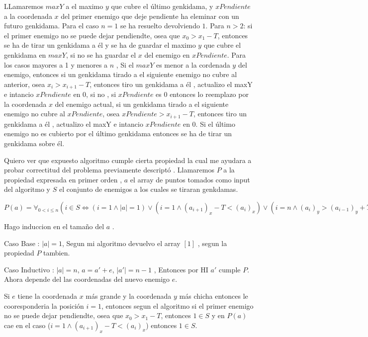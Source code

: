         LLamaremos $maxY$ a el maximo $y$ que cubre el último genkidama, y $xPendiente$ a la coordenada $x$ del primer enemigo que deje pendiente ha eleminar con un futuro genkidama.
        Para el caso $n = 1$ se ha resuelto devolviendo $1$. Para $n > 2$: si el primer enemigo no se puede dejar pendiendte, osea que $x_0 > x_1  - T$, entonces se ha de tirar un genkidama a él y se ha de guardar el maximo $y$ que cubre el genkidama en $maxY$, si no se ha guardar el $x$ del enemigo en $xPendiente$. Para los casos mayores a 1 y menores a $n$ , Si el $maxY$ es menor a la cordenada $y$ del enemigo, entonces si un genkidama tirado a el siguiente enemigo no cubre al anterior, osea $x_i > x_{i+1} - T$,  entonces tiro un genkidama a él , actualizo el maxY e intancio $xPendiente$ en $0$, si no , si $xPendiente$ es $0$ entonces lo reemplazo por la coordenada $x$ del enemigo actual, si un genkidama tirado a el siguiente enemigo no cubre al $xPendiente$, osea  $xPendiente > x_{i+1} - T$, entonces tiro un genkidama a él , actualizo el maxY e intancio $xPendiente$ en $0$. Si el último enemigo no es cubierto por el último genkidama entonces se ha de tirar un genkidama sobre él.

        Quiero ver que expuesto algoritmo cumple cierta propiedad la cual me ayudara a probar correctitud del problema previamente descriptó . Llamaremos $P$ a la propiedad expresada en primer orden , $a$ el array de puntos tomados como input del algoritmo y $S$ el conjunto de enemigos a los cuales se tiraran genkdamas. 
        
        $P(a) = \forall_{0 < i \leq n} ( i \in S  \iff (i = 1 \land |a| = 1 ) \lor ( i = 1  \land (a_{i+1})_x - T  < (a_i)_x ) \lor ( i = n \land (a_i)_y > (a_{i - 1})_y + T ) \lor ( (1 < i < n) \land ( (a_{i+1})_x - T  < (a_i)_x ) ) \land ( (a_i)_y > (a_{i - 1})_y + T ) ) )  $
        
        Hago induccion en el tamaño del $a$ .


        Caso Base : $|a| = 1$, Segun mi algoritmo devuelvo el array $[1]$ , segun la propiedad $P$ tambien.

        Caso Inductivo : $|a| = n$, $a = a' + e $, $|a'| = n - 1$ , Entonces por HI $a'$ cumple $P$. Ahora depende del las coordenadas del nuevo enemigo $e$. 

        Si $e$ tiene la coordenada $x$ más grande y la coordenada $y$ más chicha entonces le cooresponderia la posición $i = 1$, entonces segun el algoritmo si el primer enemigo no se puede dejar pendiendte, osea que $x_0 > x_1  - T$, entonces $1 \in S$ y en $P(a)$ cae en el caso  ($i = 1  \land (a_{i+1})_x - T  < (a_i)_x$) entonces $1 \in S$.





